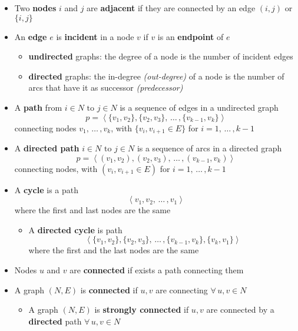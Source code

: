 \documentclass[english]{article}
\begin{document}
\begin{itemize}
  \item Two \textbf{nodes} \(i\) and \(j\) are \textbf{adjacent} if they are connected by an edge \((i, j)\) or \(\{i, j\}\)
  \item An \textbf{edge} \(e\) is \textbf{incident} in a node \(v\) if \(v\) is an \textbf{endpoint} of \(e\)
        \begin{itemize}
          \item \textbf{undirected} graphs: the degree of a node is the number of incident edges
          \item \textbf{directed} graphs: the in-degree \textit{(out-degree)} of a node is the number of arcs that have it as successor \textit{(predecessor)}
        \end{itemize}
  \item A \textbf{path} from \(i \in N \text{ to } j \in N\) is a sequence of edges in a undirected graph
        \[ p = \left\langle \{v_1, v_2\}, \{v_2, v_3\}, \, \ldots \,, \{v_{k-1}, v_k\}\right\rangle \]
        connecting nodes \(v_1, \, \ldots \,, v_k\), with \(\{v_i, v_{i+1} \in E\}\) for \(i = 1, \, \ldots \,, k-1\)
  \item A \textbf{directed path} \(i \in N \text{ to } j \in N\) is a sequence of arcs in a directed graph
        \[ p = \left\langle (v_1, v_2), (v_2, v_3), \, \ldots \,, (v_{k-1}, v_k)\right\rangle \]
        connecting nodes, with  \((v_i, v_{i+1} \in E)\)  for \(i = 1, \, \ldots \,, k-1\)
  \item A \textbf{cycle} is a path \[ \left\langle v_1, v_2, \, \ldots \,, v_1 \right\rangle \] where the first and last nodes are the same
        \begin{itemize}
          \item A \textbf{directed cycle} is path \[ \left\langle \{v_1, v_2\}, \{v_2, v_3\}, \, \ldots \,, \{v_{k-1}, v_k\}, \{v_k, v_1\}\right\rangle \]
                where the first and the last nodes are the same
        \end{itemize}
  \item Nodes \(u\) and \(v\) are \textbf{connected} if exists a path connecting them
  \item A graph \((N, E)\) is \textbf{connected} if \(u, v\) are connecting \(\forall \, u, v \in N\)
        \begin{itemize}
          \item A graph \((N, E)\) is \textbf{strongly connected} if \(u, v\) are connected by a \textbf{directed} path \(\forall \, u, v \in N\)

\end{itemize}
\end{itemize}
\end{document}
